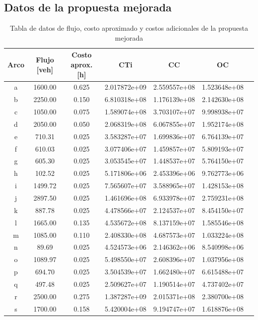 \documentclass[letterpaper,12pt]{article}
\begin{document}
\newpage
\subsection{Datos de la propuesta mejorada}
\begin{table}[H]
    \centering
    \begin{tabular}{ccccccc}
        \toprule
        \textbf{Arco} & \textbf{Flujo [veh]} & \textbf{Costo aprox. [h]} & \textbf{CTi} & \textbf{CC} & \textbf{OC} \\
        \midrule
        a & 1600.00 & 0.625 & 2.017872e+09 & 2.559557e+08 & 1.523648e+08 \\
        b & 2250.00 & 0.150 & 6.810318e+08 & 1.176139e+08 & 2.142630e+08 \\
        c & 1050.00 & 0.075 & 1.589074e+08 & 3.703107e+07 & 9.998938e+07 \\
        d & 2050.00 & 0.050 & 2.068319e+08 & 6.067855e+07 & 1.952174e+08 \\
        e & 710.31  & 0.025 & 3.583287e+07 & 1.699836e+07 & 6.764139e+07 \\
        f & 610.03  & 0.025 & 3.077406e+07 & 1.459857e+07 & 5.809193e+07 \\
        g & 605.30  & 0.025 & 3.053545e+07 & 1.448537e+07 & 5.764150e+07 \\
        h & 102.52  & 0.025 & 5.171806e+06 & 2.453396e+06 & 9.762773e+06 \\
        i & 1499.72 & 0.025 & 7.565607e+07 & 3.588965e+07 & 1.428153e+08 \\
        j & 2897.50 & 0.025 & 1.461696e+08 & 6.933978e+07 & 2.759231e+08 \\
        k & 887.78  & 0.025 & 4.478566e+07 & 2.124537e+07 & 8.454150e+07 \\
        l & 1665.00 & 0.135 & 4.535672e+08 & 8.137159e+07 & 1.585546e+08 \\
        m & 1085.00 & 0.110 & 2.408330e+08 & 4.687573e+07 & 1.033224e+08 \\
        n & 89.69   & 0.025 & 4.524573e+06 & 2.146362e+06 & 8.540998e+06 \\
        o & 1089.97 & 0.025 & 5.498550e+07 & 2.608396e+07 & 1.037956e+08 \\
        p & 694.70  & 0.025 & 3.504539e+07 & 1.662480e+07 & 6.615488e+07 \\
        q & 497.48  & 0.025 & 2.509627e+07 & 1.190514e+07 & 4.737402e+07 \\
        r & 2500.00 & 0.275 & 1.387287e+09 & 2.015371e+08 & 2.380700e+08 \\
        s & 1700.00 & 0.158 & 5.420004e+08 & 9.194747e+07 & 1.618876e+08 \\
        \bottomrule
    \end{tabular}
    \caption{Tabla de datos de flujo, costo aproximado y costos adicionales de la propuesta mejorada}
    \label{tab:datos}
\end{table}
\end{document}
